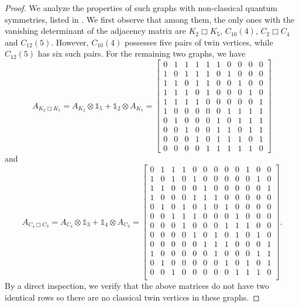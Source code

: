 \documentclass[11pt,reqno]{amsart}
\newcommand{\I}{\mathds{1}}
\newcommand{\tens}{\otimes}
\begin{document}
\begin{proof}
We analyze the properties of such graphs with non-classical quantum symmetries, listed in \cite[Tables 1-2]{Schanz24}. We first observe that among them, the only ones with the vanishing determinant of the adjacency matrix are $K_2\Box K_5$, $C_{10}(4)$, $C_2\Box C_4$ and $C_{12}(5)$. However, $C_{10}(4)$ possesses five pairs of twin vertices, while $C_{12}(5)$ has six such pairs. For the remaining two graphs, we have
\[
A_{\scriptscriptstyle K_2\Box K_5}=A_{\scriptscriptstyle K_2}\tens\I_5 +\I_2\tens A_{\scriptscriptstyle K_5}=\begin{bmatrix}
0 & 1 & 1 & 1 & 1 & 1 & 0 & 0 & 0 & 0\\
1 & 0 & 1 & 1 & 1 & 0 & 1 & 0 & 0 & 0\\
1 & 1 & 0 & 1 & 1 & 0 & 0 & 1 & 0 & 0\\
1 & 1 & 1 & 0 & 1 & 0 & 0 & 0 & 1 & 0\\
1 & 1 & 1 & 1 & 0 & 0 & 0 & 0 & 0 & 1\\
1 & 0 & 0 & 0 & 0 & 0 & 1 & 1 & 1 & 1\\
0 & 1 & 0 & 0 & 0 & 1 & 0 & 1 & 1 & 1\\
0 & 0 & 1 & 0 & 0 & 1 & 1 & 0 & 1 & 1\\
0 & 0 & 0 & 1 & 0 & 1 & 1 & 1 & 0 & 1\\
0 & 0 & 0 & 0 & 1 & 1 & 1 & 1 & 1 & 0
\end{bmatrix}
\]
and
\[
A_{\scriptscriptstyle C_4\Box C_3}=A_{\scriptscriptstyle C_4}\tens\I_3 +\I_4\tens A_{\scriptscriptstyle C_3}
=\left[
\begin{array}{cccccccccccc}
 0 & 1 & 1 & 1 & 0 & 0 & 0 & 0 & 0 & 1 & 0 & 0\\
 1 & 0 & 1 & 0 & 1 & 0 & 0 & 0 & 0 & 0 & 1 & 0\\
 1 & 1 & 0 & 0 & 0 & 1 & 0 & 0 & 0 & 0 & 0 & 1\\
 1 & 0 & 0 & 0 & 1 & 1 & 1 & 0 & 0 & 0 & 0 & 0\\
 0 & 1 & 0 & 1 & 0 & 1 & 0 & 1 & 0 & 0 & 0 & 0\\
 0 & 0 & 1 & 1 & 1 & 0 & 0 & 0 & 1 & 0 & 0 & 0\\
 0 & 0 & 0 & 1 & 0 & 0 & 0 & 1 & 1 & 1 & 0 & 0\\
 0 & 0 & 0 & 0 & 1 & 0 & 1 & 0 & 1 & 0 & 1 & 0\\
 0 & 0 & 0 & 0 & 0 & 1 & 1 & 1 & 0 & 0 & 0 & 1\\
 1 & 0 & 0 & 0 & 0 & 0 & 1 & 0 & 0 & 0 & 1 & 1\\
 0 & 1 & 0 & 0 & 0 & 0 & 0 & 1 & 0 & 1 & 0 & 1\\
 0 & 0 & 1 & 0 & 0 & 0 & 0 & 0 & 1 & 1 & 1 & 0\\
\end{array}
\right].
\]
By a direct inspection, we verify that the above matrices do not have two identical rows so there are no classical twin vertices in these graphs.
\end{proof}
\end{document}
